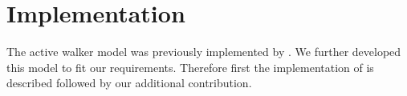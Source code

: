 \section{Implementation}

The active walker model was previously implemented by \citet{trailsystems}. We further developed this model to fit our requirements. Therefore first the implementation of \citet{trailsystems} is described followed by our additional contribution.

